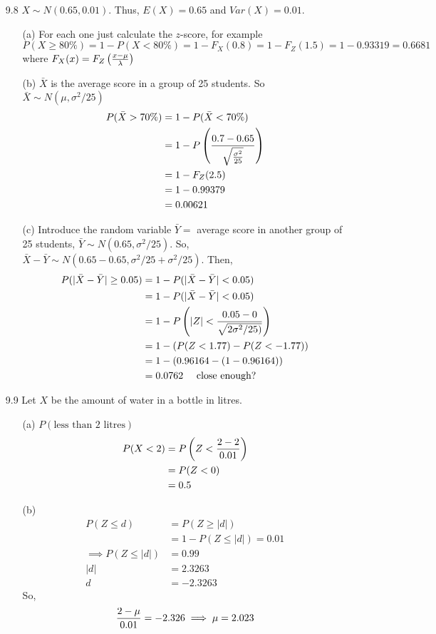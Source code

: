 \documentclass[english, 11pt]{article}
\begin{document}
\begin{itemize}
\item[9.8] $X \sim N(0.65, 0.01)$. Thus, $E(X) = 0.65$ and $Var(X) = 0.01$.
\begin{itemize}
  \item[(a)] For each one just calculate the $z$-score, for example
  \[ P(X \geq 80\%) = 1 - P(X < 80\%) = 1 - F_X(0.8) = 1 - F_Z(1.5) = 1 - 0.93319 = 0.6681 \]
  where $F_X(x) = F_Z \left( \frac{x - \mu}{\lambda} \right)$
  \item[(b)] $\bar{X}$ is the average score in a group of 25 students. So $\bar{X} \sim N(\mu, \sigma^2/25)$
  \begin{align*}
    P(\bar{X} > 70\%) & = 1 - P(\bar{X} < 70\%) \\
                  & = 1 - P \left( \frac{0.7 - 0.65}{\sqrt{\frac{\sigma^2}{25}}} \right) \\
                  & = 1 - F_Z(2.5) \\
                  & = 1 - 0.99379 \\
                  & = 0.00621
  \end{align*}
  \item[(c)]
  Introduce the random variable $\bar{Y} = $ average score in another group of 25 students, $\bar{Y} \sim N(0.65, \sigma^2/25)$. So, $\bar{X} - \bar{Y} \sim N(0.65 - 0.65, \sigma^2/25 + \sigma^2/25)$. Then,
  \begin{align*}
    P(|\bar{X} - \bar{Y}| \geq 0.05) & = 1 - P(|\bar{X} - \bar{Y}| < 0.05) \\
    & = 1 - P(|\bar{X} - \bar{Y}| < 0.05) \\
    & = 1 - P \left(|Z| < \frac{0.05 - 0}{\sqrt{2\sigma^2/25)}} \right) \\
    & = 1 - (P(Z < 1.77) - P(Z < -1.77)) \\
    & = 1 - (0.96164 - (1 - 0.96164)) \\
    & = 0.0762 \mbox{ \ \ \ close enough?}
  \end{align*}
\end{itemize}

\item[9.9] Let $X$ be the amount of water in a bottle in litres.
\begin{itemize}
  \item[(a)] $P(\mbox{less than 2 litres})$
  \begin{align*}
    P(X < 2) & = P \left( Z < \frac{2 - 2}{0.01} \right) \\
             & = P(Z < 0) \\
             & = 0.5
  \end{align*}
  \item[(b)]
  \begin{align*}
    P(Z \leq d) & = P(Z \geq |d|) \\
    & = 1 - P(Z \leq |d|) = 0.01 \\
    \implies P(Z \leq |d|) & = 0.99 \\
    |d| & = 2.3263 \\
    d & = -2.3263
  \end{align*}
  So,
  \[ \frac{2-\mu}{0.01} = -2.326 \implies \mu = 2.023 \]
\end{itemize}


\end{itemize}
\end{document}
